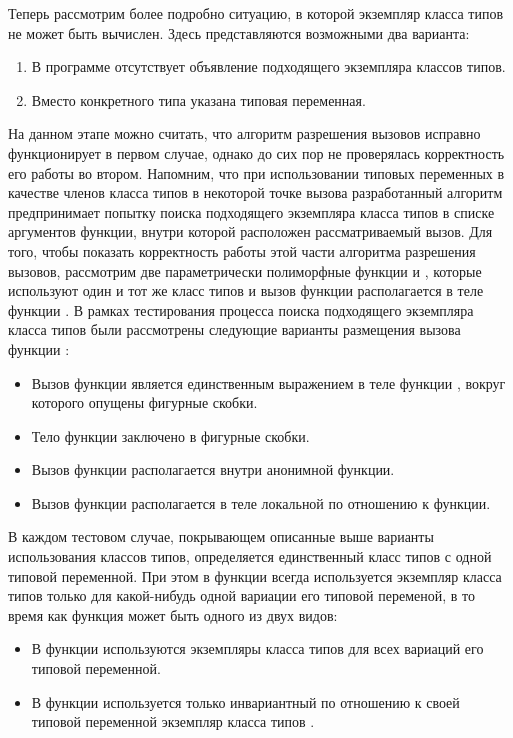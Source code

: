 Теперь рассмотрим более подробно ситуацию, в которой экземпляр класса типов не может быть вычислен. Здесь представляются возможными два варианта:
\begin{enumerate}
    \item В программе отсутствует объявление подходящего экземпляра классов типов.  
    \item Вместо конкретного типа указана типовая переменная.  
\end{enumerate}
На данном этапе можно считать, что алгоритм разрешения вызовов исправно функционирует в первом случае, однако до сих пор не проверялась корректность его работы во втором. Напомним, что при использовании типовых переменных в качестве членов класса типов в некоторой точке вызова разработанный алгоритм предпринимает попытку поиска подходящего экземпляра класса типов в списке аргументов функции, внутри которой расположен рассматриваемый вызов. Для того, чтобы показать корректность работы этой части алгоритма разрешения вызовов, рассмотрим две параметрически полиморфные функции  и , которые используют один и тот же класс типов и вызов функции  располагается в теле функции . В рамках тестирования процесса поиска подходящего экземпляра класса типов были рассмотрены следующие варианты размещения вызова функции :
\begin{itemize}
    \item Вызов функции  является единственным выражением в теле функции , вокруг которого опущены фигурные скобки. 
    \item Тело функции  заключено в фигурные скобки. 
    \item Вызов функции  располагается внутри анонимной функции.
    \item Вызов функции  располагается в теле локальной по отношению к  функции. 
\end{itemize}
В каждом тестовом случае, покрывающем описанные выше варианты использования классов типов, определяется единственный класс типов  с одной типовой переменной. При этом в функции  всегда используется экземпляр класса типов  только для какой-нибудь одной вариации его типовой переменой, в то время как функция  может быть одного из двух видов:
\begin{itemize}
    \item В функции  используются экземпляры класса типов  для всех вариаций его типовой переменной.
    \item В функции  используется только инвариантный по отношению к своей типовой переменной экземпляр класса типов .
\end{itemize}
